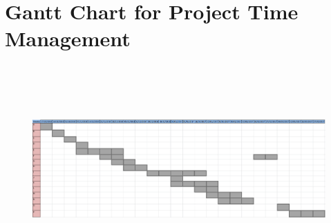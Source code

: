  
\section{Gantt Chart for Project Time Management}
\pagestyle{empty}
\begin{landscape}
\vspace*{1cm}
\hspace*{-3cm}
\begin{figure}[H]
\includegraphics[width =700px, height=300px]{../Graphics/TimePlanUpdated2.png} \par
\end{figure}
\end{landscape}

